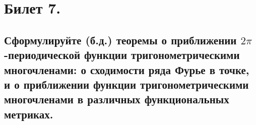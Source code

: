 \section{Билет 7.}

\subsection{Сформулируйте (б.д.) теоремы о приближении $2\pi$-периодической функции тригонометрическими многочленами: о сходимости ряда Фурье в точке, и о приближении функции тригонометрическими многочленами в различных функциональных метриках.}